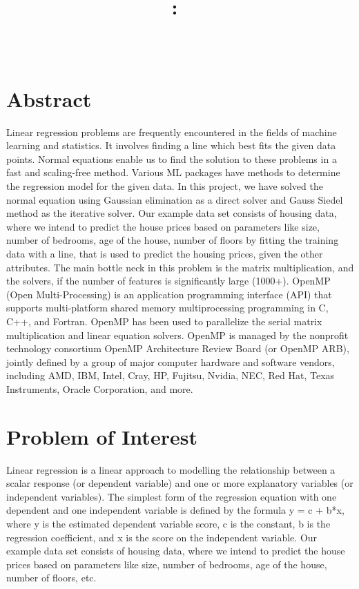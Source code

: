 \documentclass{article}
\title{\vspace{2in}\textmd{\textbf{\hmwkClass:\ \hmwkTitle}} \\
\vspace{0.1in}\large{ \hmwkClassTime}\vspace{3in}}
\author{\textbf{\hmwkAuthorName} \\ \vspace{0.1in}
\hmwkDueDate }
\date{} %
\begin{document}
\begin{spacing}{1.1}
\maketitle

\newpage
\section*{Abstract}

Linear regression problems are frequently encountered in the fields of machine learning and statistics. It involves finding a line which best fits the given data points. Normal equations enable us to find the solution to these problems in a fast and scaling-free method. Various ML packages have methods to determine the regression model for the given data. In this project, we have solved the normal equation using Gaussian elimination as a direct solver and Gauss Siedel method as the iterative solver. Our example data set \cite{UCI} consists of housing data, where we intend to predict the house prices based on parameters like size, number of bedrooms, age of the house, number of floors by fitting the training data with a line, that is used to predict the housing prices, given the other attributes. The main bottle neck in this problem is the matrix multiplication, and the solvers, if the number of features is significantly large (1000+). OpenMP (Open Multi-Processing) is an application programming interface (API) that supports multi-platform shared memory multiprocessing programming in C, C++, and Fortran. OpenMP has been used to parallelize the serial matrix multiplication and linear equation solvers. OpenMP is managed by the nonprofit technology consortium OpenMP Architecture Review Board (or OpenMP ARB), jointly defined by a group of major computer hardware and software vendors, including AMD, IBM, Intel, Cray, HP, Fujitsu, Nvidia, NEC, Red Hat, Texas Instruments, Oracle Corporation, and more. \cite{OMP}

\section{Problem of Interest}

\begin{itemize}
    Linear regression is a linear approach to modelling the relationship between a scalar response (or dependent variable) and one or more explanatory variables (or independent variables). The simplest form of the regression equation with one dependent and one independent variable is defined by the formula y = c + b*x, where y is the estimated dependent variable score, c is the constant, b is the regression coefficient, and x is the score on the independent variable. Our example data set consists of housing data, where we intend to predict the house prices based on parameters like size, number of bedrooms, age of the house, number of floors, etc. \newline \newline

\end{itemize}
\end{spacing}
\end{document}
